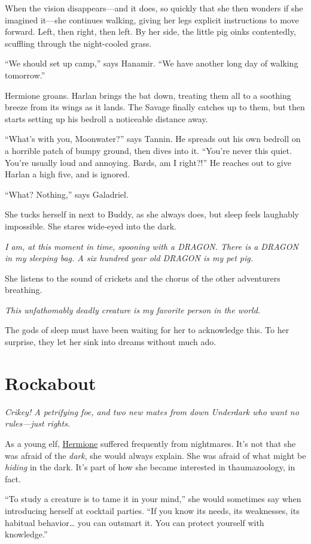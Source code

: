 \documentclass[smalldemyvopaper,11pt,twoside,onecolumn,openright,extrafontsizes]{memoir}
\newcommand{\chapdesc}[1]{
    \begin{flushright}
    \emph{{#1}}
    \end{flushright}
    \vspace{26pt}
}
\begin{document}
When the vision disappears---and it does, so quickly that she then
wonders if she imagined it---she continues walking, giving her legs
explicit instructions to move forward. Left, then right, then left. By
her side, the little pig oinks contentedly, scuffling through the
night-cooled grass.

``We should set up camp,'' says Hanamir. ``We have another long day of
walking tomorrow.''

Hermione groans. Harlan brings the bat down, treating them all to a
soothing breeze from its wings as it lands. The Savage finally catches
up to them, but then starts setting up his bedroll a noticeable distance
away.

``What's with you, Moonwater?'' says Tannin. He spreads out his own
bedroll on a horrible patch of bumpy ground, then dives into it.
``You're never this quiet. You're usually loud and annoying. Bards, am I
right?!'' He reaches out to give Harlan a high five, and is ignored.

``What? Nothing,'' says Galadriel.

She tucks herself in next to Buddy, as she always does, but sleep feels
laughably impossible. She stares wide-eyed into the dark.

\emph{I am, at this moment in time, spooning with a DRAGON. There is a
DRAGON in my sleeping bag. A six hundred year old DRAGON is my pet pig.}

She listens to the sound of crickets and the chorus of the other
adventurers breathing.

\emph{This unfathomably deadly creature is my favorite person in the
world.}

The gods of sleep must have been waiting for her to acknowledge this. To
her surprise, they let her sink into dreams without much ado.


\chapter{Rockabout}
\chapdesc{Crikey! A petrifying foe, and two new mates from down Underdark who want no rules—just rights.}

As a young elf, \href{/characters/hermione/}{Hermione} suffered
frequently from nightmares. It's not that she was afraid of the
\emph{dark}, she would always explain. She was afraid of what might be
\emph{hiding} in the dark. It's part of how she became interested in
thaumazoology, in fact.

``To study a creature is to tame it in your mind,'' she would sometimes
say when introducing herself at cocktail parties. ``If you know its
needs, its weaknesses, its habitual behavior\ldots{} you can outsmart
it. You can protect yourself with knowledge.''
\end{document}
